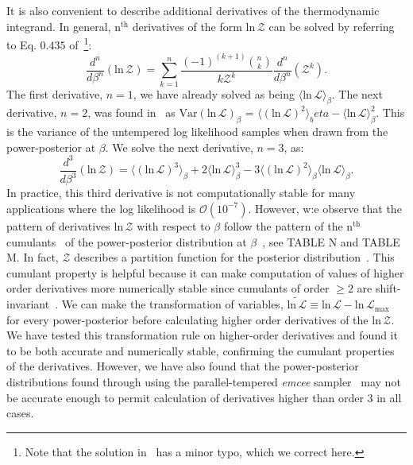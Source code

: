 It is also convenient to describe additional derivatives of the thermodynamic integrand. In general, $\mathrm{n}^{\mathrm{th}}$ derivatives of the form $\mathrm{ln} \, \mathcal{Z}$ can be solved by referring to Eq. $0.435$ of~\cite{gradshteyn2015table}\footnote{Note that the solution in~\cite{gradshteyn2015table} has a minor typo, which we correct here.}:
\begin{equation}\label{eqn:gradshteyn_derivatives}
    \frac{d^n}{d\beta^n}\left( \mathrm{ln} \, \mathcal{Z} \right) = \sum_{k=1}^{n} \frac{(-1)^{(k+1)} {{n}\choose{k}}}{k \mathcal{Z}^k} \frac{d^n}{d\beta^n} \left(\mathcal{Z}^k\right).
\end{equation}
The first derivative, $n=1$, we have already solved as being $\langle \mathrm{ln} \, \mathcal{L} \rangle_\beta$. The next derivative, $n=2$, was found in~\cite{friel2014improving} as $\mathrm{Var}(\mathrm{ln} \, \mathcal{L})_\beta$ = $\langle (\mathrm{ln} \, \mathcal{L})^2\rangle_beta - \langle \mathrm{ln} \, \mathcal{L} \rangle^2_\beta$. This is the variance of the untempered log likelihood samples when drawn from the power-posterior at $\beta$. We solve the next derivative, $n=3$, as:
\begin{equation}\label{eqn:third_ti_deriv}
    \frac{d^3}{d\beta^3}\left( \mathrm{ln} \, \mathcal{Z}\right) = \langle \left(\mathrm{ln} \, \mathcal{L} \right)^3\rangle_\beta + 2 \langle \mathrm{ln} \, \mathcal{L} \rangle^3_\beta - 3 \langle \left(\mathrm{ln} \, \mathcal{L} \right)^2\rangle_\beta \langle \mathrm{ln} \, \mathcal{L}\rangle_\beta.
\end{equation}
In practice, this third derivative is not computationally stable for many applications where the log likelihood is $\mathcal{O}(10^{-7})$. However, w:e observe that the pattern of derivatives $\mathrm{ln} \, \mathcal{Z}$ with respect to $\beta$ follow the pattern of the $\mathrm{n}^{\mathrm{th}}$ cumulants~\citep{kardar2007statistical} of the power-posterior distribution at $\beta$~\cite{friel2014improving, carlson2016partition}, see TABLE N and TABLE M. In fact, $\mathcal{Z}$ describes a partition function for the posterior distribution~\citep{carlson2016partition, lamont2019correspondence}. This cumulant property is helpful because it can make computation of values of higher order derivatives more numerically stable since cumulants of order $\ge 2$ are shift-invariant~\cite{kardar2007statistical}. We can make the transformation of variables, $\widetilde{\mathrm{ln} \, \mathcal{L}} \equiv \mathrm{ln} \, \mathcal{L} - \mathrm{ln} \, \mathcal{L}_{\mathrm{max}}$ for every power-posterior before calculating higher order derivatives of the $\mathrm{ln} \, \mathcal{Z}$. We have tested this transformation rule on higher-order derivatives and found it to be both accurate and numerically stable, confirming the cumulant properties of the derivatives. However, we have also found that the power-posterior distributions found through using the parallel-tempered \emph{emcee} sampler~\citep{emcee,vousden:2016} may not be accurate enough to permit calculation of derivatives higher than order $3$ in all cases.

